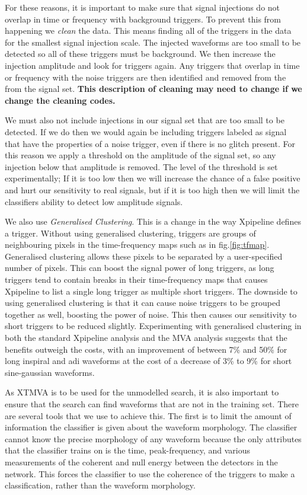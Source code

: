 \documentclass[11pt]{cuthesis}
\begin{document}
For these reasons, it is important to make sure that signal injections do not overlap in time or frequency with background triggers. To prevent this from happening we \textit{clean} the data. This means finding all of the triggers in the data for the smallest signal injection scale. The injected waveforms are too small to be detected so all of these triggers must be background. We then increase the injection amplitude and look for triggers again. Any triggers that overlap in time or frequency with the noise triggers are then identified and removed from the from the signal set. \textbf{This description of cleaning may need to change if we change the cleaning codes.}

We must also not include injections in our signal set that are too small to be detected. If we do then we would again be including triggers labeled as signal that have the properties of a noise trigger, even if there is no glitch present. For this reason we apply a threshold on the amplitude of the signal set, so any injection below that amplitude is removed. The level of the threshold is set experimentally; If it is too low then we will increase the chance of a false positive and hurt our sensitivity to real signals, but if it is too high then we will limit the classifiers ability to detect low amplitude signals. 

We also use \textit{Generalised Clustering}. This is a change in the way Xpipeline defines a trigger. Without using generalised clustering, triggers are groups of neighbouring pixels in the time-frequency maps such as in fig.\ref{fig:tfmap}. Generalised clustering allows these pixels to be separated by a user-specified number of pixels. This can boost the signal power of long triggers, as long triggers tend to contain breaks in their time-frequency maps that causes Xpipeline to list a single long trigger as multiple short triggers. The downside to using generalised clustering is that it can cause noise triggers to be grouped together as well, boosting the power of noise. This then causes our sensitivity to short triggers to be reduced slightly. Experimenting with generalised clustering in both the standard Xpipeline analysis and the MVA analysis suggests that the benefits outweigh the costs, with an improvement of between 7\% and 50\% for long inspiral and adi waveforms at the cost of a decrease of 3\% to 9\% for short sine-gaussian waveforms.  

As XTMVA is to be used for the unmodelled search, it is also important to ensure that the search can find waveforms that are not in the training set. There are several tools that we use to achieve this. The first is to limit the amount of information the classifier is given about the waveform morphology. The classifier cannot know the precise morphology of any waveform because the only attributes that the classifier trains on is the time, peak-frequency, and various measurements of the coherent and null energy between the detectors in the network. This forces the classifier to use the coherence of the triggers to make a classification, rather than the waveform morphology. 
\end{document}
